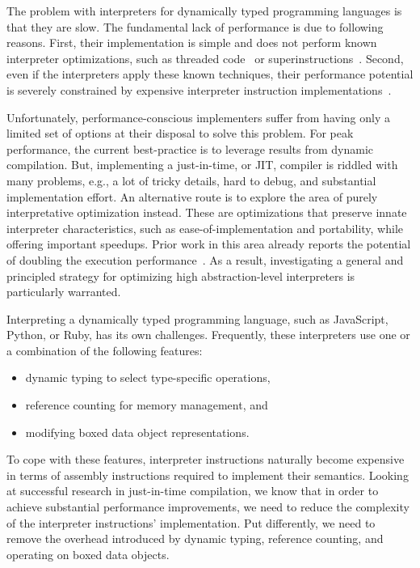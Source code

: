 \documentclass[preprint,10pt]{popl14conf}
\begin{document}
The problem with interpreters for dynamically typed programming languages is that they are slow.
The fundamental lack of performance is due to following reasons.
First, their implementation is simple and does not perform known interpreter optimizations, such
as threaded code~\cite{bell+73,debaere.campenhout+90,berndl.etal+05} or
superinstructions~\cite{proebsting+95,ertl.gregg+03,ertl.gregg+04}.
Second, even if the interpreters apply these known techniques, their performance potential is
severely constrained by expensive interpreter instruction implementations~\cite{brunthaler+09}.

Unfortunately, performance-conscious implementers suffer from having only a limited set of options
at their disposal to solve this problem.
For peak performance, the current best-practice is to leverage results from dynamic compilation.
But, implementing a just-in-time, or JIT, compiler is riddled with many problems, e.g., a lot of
tricky details, hard to debug, and substantial implementation effort.
An alternative route is to explore the area of purely interpretative optimization instead.
These are optimizations that preserve innate interpreter characteristics, such as
ease-of-implementation and portability, while offering important speedups.
Prior work in this area already reports the potential of doubling the execution
performance~\cite{brunthaler+10a,brunthaler+10b}.
As a result, investigating a general and principled strategy for optimizing high abstraction-level
interpreters is particularly warranted.

Interpreting a dynamically typed programming language, such as JavaScript, Python, or Ruby, has its
own challenges.
Frequently, these interpreters use one or a combination of the following features:
\begin{itemize}
\item dynamic typing to select type-specific operations,
\item reference counting for memory management, and
\item modifying boxed data object representations.
\end{itemize}
To cope with these features, interpreter instructions naturally become expensive in terms of
assembly instructions required to implement their semantics.
Looking at successful research in just-in-time compilation, we know that in order to achieve
substantial performance improvements, we need to reduce the complexity of the interpreter
instructions' implementation.
Put differently, we need to remove the overhead introduced by dynamic typing, reference counting,
and operating on boxed data objects.
\end{document}
